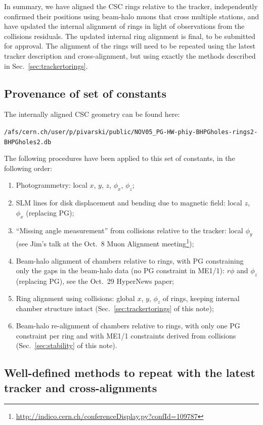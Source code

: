 \documentclass[12pt]{article}
\begin{document}
In summary, we have aligned the CSC rings relative to the tracker,
independently confirmed their positions using beam-halo muons that
cross multiple stations, and have updated the internal alignment of
rings in light of observations from the collisions residuals.  The
updated internal ring alignment is final, to be submitted for
approval.  The alignment of the rings will need to be repeated using
the latest tracker description and cross-alignment, but using exactly
the methods described in Sec.~\ref{sec:trackertorings}.

\subsection{Provenance of set of constants}

The internally aligned CSC geometry can be found here:

{\tt \small /afs/cern.ch/user/p/pivarski/public/NOV05\_PG-HW-phiy-BHPGholes-rings2-BHPGholes2.db}

\noindent The following procedures have been applied to this set of constants, in the following order:

\begin{enumerate}
\item Photogrammetry: local $x$, $y$, $z$, $\phi_x$, $\phi_z$;
\item SLM lines for disk displacement and bending due to magnetic field: local $z$, $\phi_x$ (replacing PG);
\item ``Missing angle measurement'' from collisions relative to the
  tracker: local $\phi_y$ (see Jim's talk at the Oct.~8 Muon Alignment
  meeting\footnote{\url{http://indico.cern.ch/conferenceDisplay.py?confId=109787}});
\item Beam-halo alignment of chambers relative to rings, with PG
  constraining only the gaps in the beam-halo data (no PG constraint
  in ME1/1): $r\phi$ and $\phi_z$ (replacing PG), see the Oct.~29
  HyperNews paper;
\item Ring alignment using collisions: global $x$, $y$, $\phi_z$ of
  rings, keeping internal chamber structure intact
  (Sec.~\ref{sec:trackertorings} of this note);
\item Beam-halo re-alignment of chambers relative to rings, with only
  one PG constraint per ring and with ME1/1 constraints derived from
  collisions (Sec.~\ref{sec:stability} of this note).
\end{enumerate}

\subsection{Well-defined methods to repeat with the latest tracker and cross-alignments}
\end{document}
